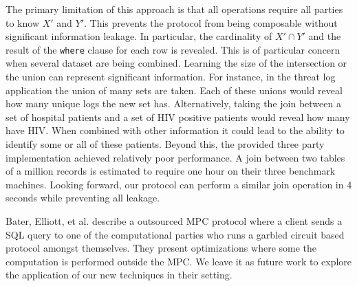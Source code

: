 The primary limitation of this approach is that all operations require all parties to know $X'$ and $Y'$. This prevents the protocol from being composable without significant information leakage. In particular, the cardinality of $X'\cap Y'$ and the result of the \texttt{where} clause for each row is revealed. This is of particular concern when several dataset are being combined. Learning the size of the intersection or the union can represent significant information. For instance, in the threat log application the union of many sets are taken. Each of these unions would reveal how many unique logs the new set has. Alternatively, taking the join between a set of hospital patients and a set of HIV positive patients would reveal how many have HIV. When combined with other information it could lead to the ability to identify some or all of these patients. Beyond this, the provided three party implementation achieved relatively poor performance. A join between two tables of a million records is estimated to require one hour on their three benchmark machines\cite{LTW13}. Looking forward, our protocol can perform a similar join operation in 4 seconds while preventing all leakage.

Bater, Elliott, et al.\cite{SMCQL} describe a outsourced MPC protocol where a client sends a SQL query to one of the computational parties who runs a garbled circuit based protocol amongst themselves. They present optimizations where some the computation is performed outside the MPC. We leave it as future work to explore the application of our new techniques in their setting.

